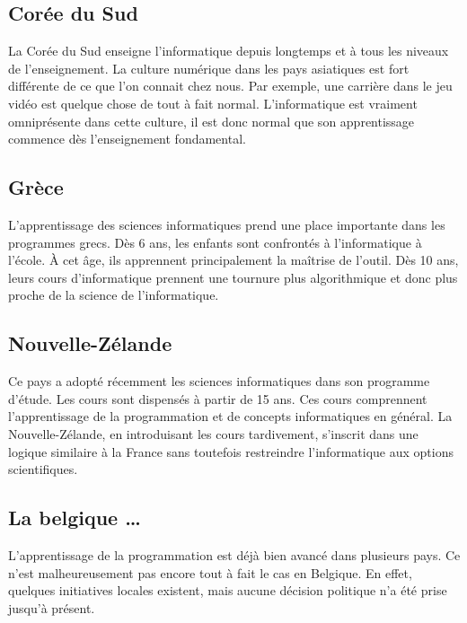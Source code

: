 \subsection{Corée du Sud}
La Corée du Sud enseigne l'informatique depuis longtemps et à tous les niveaux de l'enseignement. La culture numérique dans les pays asiatiques est fort différente de ce que l'on connait chez nous. Par exemple, une carrière dans le jeu vidéo est quelque chose de tout à fait normal. L'informatique est vraiment omniprésente dans cette culture, il est donc normal que son apprentissage commence dès l'enseignement fondamental.

\subsection{Grèce}
L'apprentissage des sciences informatiques prend une place importante dans les programmes grecs. Dès 6 ans, les enfants sont confrontés à l'informatique à l'école. À cet âge, ils apprennent principalement la maîtrise de l'outil. Dès 10 ans, leurs cours d'informatique prennent une tournure plus algorithmique et donc plus proche de la science de l'informatique.

\subsection{Nouvelle-Zélande}
Ce pays a adopté récemment les sciences informatiques dans son programme d'étude. Les cours sont dispensés à partir de 15 ans. Ces cours comprennent l'apprentissage de la programmation et de concepts informatiques en général. La Nouvelle-Zélande, en introduisant les cours tardivement, s'inscrit dans une logique similaire à la France sans toutefois restreindre l'informatique aux options scientifiques.

\subsection{La belgique \ldots}
L'apprentissage de la programmation est déjà bien avancé dans plusieurs pays. Ce n'est malheureusement pas encore tout à fait le cas en Belgique. En effet, quelques initiatives locales existent, mais aucune décision politique n'a été prise jusqu'à présent.

